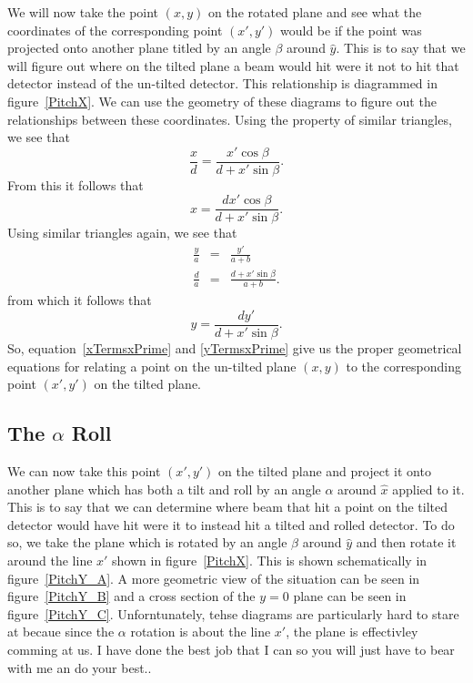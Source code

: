 We will now take the point $(x,y)$ on the rotated plane 
and see what the coordinates of the corresponding point
$(x',y')$ would be if the point was projected onto another 
plane titled by an angle $\beta$ around $\hat{y}$.
This is to say that we will figure out where on the tilted
plane a beam would hit were it not to hit that detector 
instead of the un-tilted detector.
This relationship is diagrammed in figure~\ref{PitchX}.  
We can use the geometry of these diagrams to figure out
the relationships between these coordinates. Using
the property of similar triangles, we see that
\begin{equation}
    \frac{x}{d}=\frac{x'\cos\beta}{d+x'\sin\beta}.
\end{equation}
From this it follows that 
\begin{equation}\label{xTermsxPrime}
    \boxed{x = \frac{dx'\cos\beta}{d+x'\sin\beta}.}
\end{equation}
Using similar triangles again, we see that
\begin{eqnarray}
    \frac{y}{a}&=&\frac{y'}{a+b}\\
    \frac{d}{a}&=&\frac{d+x'\sin\beta}{a+b}.
\end{eqnarray}
from which it follows that
\begin{equation}\label{yTermsxPrime}
	\boxed{y= \frac{dy'}{d+x'\sin\beta}.}
\end{equation}
So, equation~\ref{xTermsxPrime} and \ref{yTermsxPrime} give us 
the proper geometrical equations for relating a point on the 
un-tilted plane $(x,y)$ to the corresponding point 
$(x',y')$ on the tilted plane.

\subsection{The $\alpha$ Roll}
We can now take this point $(x',y')$ on the tilted 
plane and project it onto another plane which has both 
a tilt and roll by an angle $\alpha$ around $\hat{x}$ 
applied to it. This is to say that we can determine 
where beam that hit a point on the tilted detector 
would have hit were it to instead hit a tilted and 
rolled detector. To do so, we take the plane which is
rotated by an angle $\beta$ around $\hat{y}$ and then
rotate it around the line $x'$ shown in figure~\ref{PitchX}.
This is shown schematically in figure~\ref{PitchY_A}. 
A more geometric view of the situation can be seen in 
figure~\ref{PitchY_B} and a cross section of the $y=0$
plane can be seen in figure~\ref{PitchY_C}.
Unforntunately, tehse diagrams are particularly hard to
stare at becaue since the $\alpha$ rotation is about the 
line $x'$, the plane is effectivley comming at us. 
I have done the best job that I can so you will just
have to bear with me an do your best..

